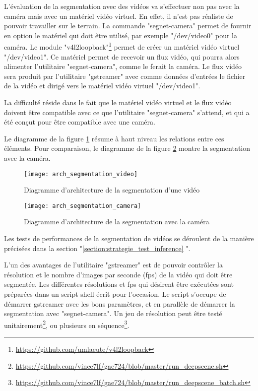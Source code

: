﻿
\par L'évaluation de la segmentation avec des vidéos va s'effectuer non pas avec la caméra mais avec un matériel vidéo virtuel. En effet, il n'est pas réaliste de pouvoir travailler sur le terrain. La commande "segnet-camera" permet de fournir en option le matériel qui doit être utilisé, par exemple "/dev/video0" pour la caméra. Le module "v4l2loopback"\footnote{\url{https://github.com/umlaeute/v4l2loopback}} permet de créer un matériel vidéo virtuel "/dev/video1". Ce matériel permet de recevoir un flux vidéo, qui pourra alors alimenter l'utilitaire "segnet-camera", comme le ferait la caméra. Le flux vidéo sera produit par l'utilitaire "gstreamer" avec comme données d'entrées le fichier de la vidéo et dirigé vers le matériel vidéo virtuel "/dev/video1".
\par La difficulté réside dans le fait que le matériel vidéo virtuel et le flux vidéo doivent être compatible avec ce que l'utilitaire "segnet-camera" s'attend, et qui a été conçut pour être compatible avec une caméra. 
\par Le diagramme de la figure \ref{fig:arch_segmentation_video} résume à haut niveau les relations entre ces éléments. Pour comparaison, le diagramme de la figure \ref{fig:arch_segmentation_camera} montre la segmentation avec la caméra. 
\begin{figure}[H]
    \centering
    \texttt{[image: arch\_segmentation\_video]}
    \caption[Diagramme d'architecture de la segmentation d'une vidéo]{Diagramme d'architecture de la segmentation d'une vidéo}
    \label{fig:arch_segmentation_video}
\end{figure}
\begin{figure}[H]
    \centering
    \texttt{[image: arch\_segmentation\_camera]}
    \caption[Diagramme d'architecture de la segmentation avec la caméra]{Diagramme d'architecture de la segmentation avec la caméra}
    \label{fig:arch_segmentation_camera}
\end{figure}
\par Les tests de performances de la segmentation de vidéos se déroulent de la manière précisées dans la section "\ref{section:strategie_test_inference} ". 
\par L'un des avantages de l'utilitaire "gstreamer" est de pouvoir contrôler la résolution et le nombre d'images par seconde (\acrshort{fps}) de la vidéo qui doit être segmentée. Les différentes résolutions et \acrshort{fps} qui désirent être exécutées sont préparées dans un script shell écrit pour l'occasion. Le script s'occupe de démarrer gstreamer avec les bons paramètres, et en parallèle de démarrer la segmentation avec "segnet-camera". Un jeu de résolution peut être testé unitairement\footnote{\url{https://github.com/vince7lf/gae724/blob/master/run_deepscene.sh}}, ou plusieurs en séquence\footnote{\url{https://github.com/vince7lf/gae724/blob/master/run_deepscene_batch.sh}}. 
